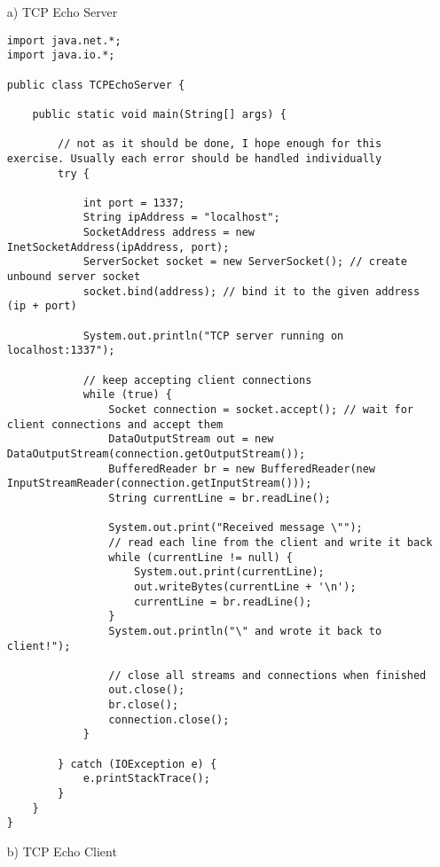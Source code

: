 \begin{enumerate}

\item[a)] TCP Echo Server

\begin{lstlisting}[style=java]
import java.net.*;
import java.io.*;

public class TCPEchoServer {

    public static void main(String[] args) {
    
        // not as it should be done, I hope enough for this exercise. Usually each error should be handled individually
        try {

            int port = 1337;
            String ipAddress = "localhost";
            SocketAddress address = new InetSocketAddress(ipAddress, port);
            ServerSocket socket = new ServerSocket(); // create unbound server socket
            socket.bind(address); // bind it to the given address (ip + port)

            System.out.println("TCP server running on localhost:1337");

            // keep accepting client connections
            while (true) {
                Socket connection = socket.accept(); // wait for client connections and accept them
                DataOutputStream out = new DataOutputStream(connection.getOutputStream());
                BufferedReader br = new BufferedReader(new InputStreamReader(connection.getInputStream()));
                String currentLine = br.readLine();

                System.out.print("Received message \"");
                // read each line from the client and write it back
                while (currentLine != null) {
                    System.out.print(currentLine);
                    out.writeBytes(currentLine + '\n');
                    currentLine = br.readLine();
                }
                System.out.println("\" and wrote it back to client!");

                // close all streams and connections when finished
                out.close();
                br.close();
                connection.close();
            }

        } catch (IOException e) {
            e.printStackTrace();
        }
    }
}

\end{lstlisting}

\item[b)] TCP Echo Client


\end{enumerate}
